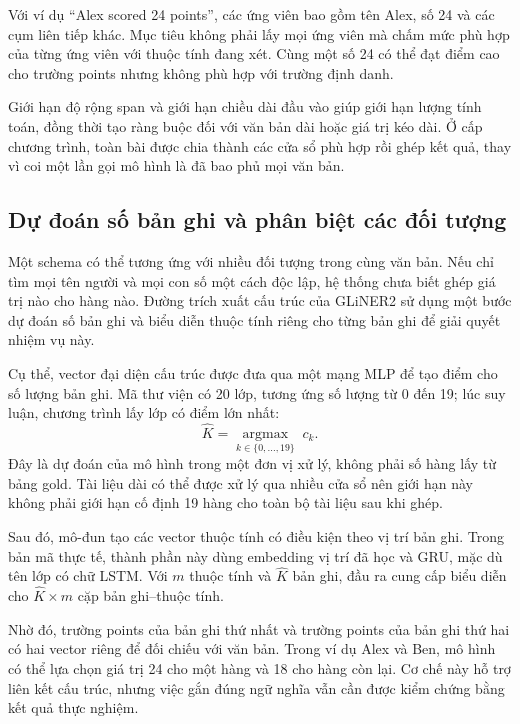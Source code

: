 Với ví dụ ``Alex scored 24 points'', các ứng viên bao gồm tên Alex, số 24 và các cụm liên tiếp khác. Mục tiêu không phải lấy mọi ứng viên mà chấm mức phù hợp của từng ứng viên với thuộc tính đang xét. Cùng một số 24 có thể đạt điểm cao cho trường points nhưng không phù hợp với trường định danh.

Giới hạn độ rộng span và giới hạn chiều dài đầu vào giúp giới hạn lượng tính toán, đồng thời tạo ràng buộc đối với văn bản dài hoặc giá trị kéo dài. Ở cấp chương trình, toàn bài được chia thành các cửa sổ phù hợp rồi ghép kết quả, thay vì coi một lần gọi mô hình là đã bao phủ mọi văn bản.

\subsection{Dự đoán số bản ghi và phân biệt các đối tượng}
Một schema có thể tương ứng với nhiều đối tượng trong cùng văn bản. Nếu chỉ tìm mọi tên người và mọi con số một cách độc lập, hệ thống chưa biết ghép giá trị nào cho hàng nào. Đường trích xuất cấu trúc của GLiNER2 sử dụng một bước dự đoán số bản ghi và biểu diễn thuộc tính riêng cho từng bản ghi để giải quyết nhiệm vụ này.

Cụ thể, vector đại diện cấu trúc được đưa qua một mạng MLP để tạo điểm cho số lượng bản ghi. Mã thư viện có 20 lớp, tương ứng số lượng từ 0 đến 19; lúc suy luận, chương trình lấy lớp có điểm lớn nhất:
\begin{equation}
\widehat K=\underset{k\in\{0,\ldots,19\}}{\operatorname{argmax}}\;c_k.
\end{equation}
Đây là dự đoán của mô hình trong một đơn vị xử lý, không phải số hàng lấy từ bảng gold. Tài liệu dài có thể được xử lý qua nhiều cửa sổ nên giới hạn này không phải giới hạn cố định 19 hàng cho toàn bộ tài liệu sau khi ghép.

Sau đó, mô-đun  tạo các vector thuộc tính có điều kiện theo vị trí bản ghi. Trong bản mã thực tế, thành phần này dùng embedding vị trí đã học và GRU, mặc dù tên lớp có chữ LSTM. Với $m$ thuộc tính và $\widehat K$ bản ghi, đầu ra cung cấp biểu diễn cho $\widehat K\times m$ cặp bản ghi--thuộc tính.

Nhờ đó, trường points của bản ghi thứ nhất và trường points của bản ghi thứ hai có hai vector riêng để đối chiếu với văn bản. Trong ví dụ Alex và Ben, mô hình có thể lựa chọn giá trị 24 cho một hàng và 18 cho hàng còn lại. Cơ chế này hỗ trợ liên kết cấu trúc, nhưng việc gắn đúng ngữ nghĩa vẫn cần được kiểm chứng bằng kết quả thực nghiệm.

